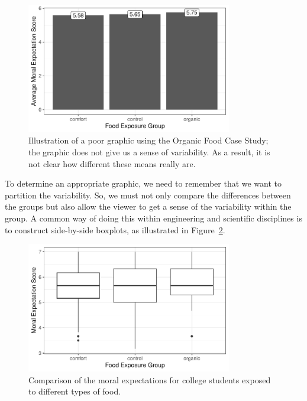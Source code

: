 \documentclass[
  letterpaper,
  DIV=11,
  numbers=noendperiod]{scrreprt}
\theoremstyle{plain}
\theoremstyle{definition}
\theoremstyle{definition}
\theoremstyle{remark}
\begin{document}
\begin{figure}

{\centering \includegraphics[width=0.8\textwidth,height=\textheight]{./images/fig-anovasummaries-bad-bar-1.pdf}

}

\caption{\label{fig-anovasummaries-bad-bar}Illustration of a poor
graphic using the Organic Food Case Study; the graphic does not give us
a sense of variability. As a result, it is not clear how different these
means really are.}

\end{figure}

To determine an appropriate graphic, we need to remember that we want to
partition the variability. So, we must not only compare the differences
between the groups but also allow the viewer to get a sense of the
variability within the group. A common way of doing this within
engineering and scientific disciplines is to construct side-by-side
boxplots, as illustrated in
Figure~\ref{fig-anovasummaries-organic-boxplot}.

\begin{figure}

{\centering \includegraphics[width=0.8\textwidth,height=\textheight]{./images/fig-anovasummaries-organic-boxplot-1.pdf}

}

\caption{\label{fig-anovasummaries-organic-boxplot}Comparison of the
moral expectations for college students exposed to different types of
food.}

\end{figure}
\end{document}
